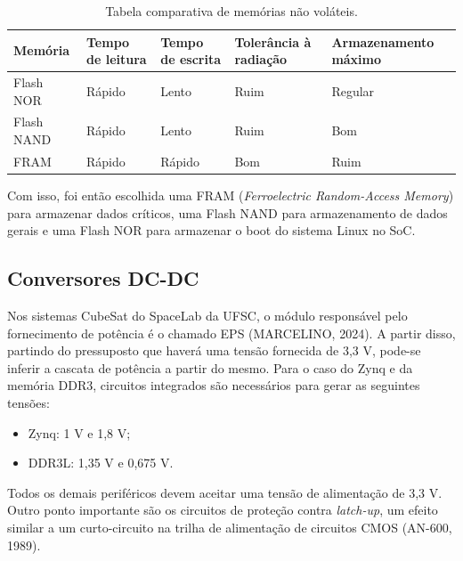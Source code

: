 \begin{table}[H]
	\ABNTEXfontereduzida
	\caption{\label{tab:memnvol}Tabela comparativa de memórias não voláteis.}
    \centering
    \begin{tabular}{@{} >{\centering}p{2cm} >{\centering}p{3cm} >{\centering}p{3cm} >{\centering}p{3cm}>{\centering}p{3cm} @{}}
    
		\toprule
		\textbf{Memória} & \textbf{Tempo de leitura} & \textbf{Tempo de escrita} & \textbf{Tolerância à radiação} & \textbf{Armazenamento máximo} \tabularnewline 
        \midrule
        Flash NOR & Rápido & Lento & Ruim & Regular\tabularnewline
        
        \midrule
        Flash NAND & Rápido & Lento & Ruim & Bom \tabularnewline 

        \midrule
        FRAM & Rápido & Rápido & Bom & Ruim \tabularnewline 
        
        \bottomrule
	\end{tabular}
\end{table}

Com isso, foi então escolhida uma FRAM (\textit{Ferroelectric Random-Access Memory}) para armazenar dados críticos, uma Flash NAND para armazenamento de dados gerais e uma Flash NOR para armazenar o boot do sistema Linux no SoC.

\subsection{Conversores DC-DC}
Nos sistemas CubeSat do SpaceLab da UFSC, o módulo responsável pelo fornecimento de potência é o chamado EPS (MARCELINO, 2024). A partir disso, partindo do pressuposto que haverá uma tensão fornecida de 3,3 V, pode-se inferir a cascata de potência a partir do mesmo. Para o caso do Zynq e da memória DDR3, circuitos integrados são necessários para gerar as seguintes tensões: 

\begin{itemize}
	\item Zynq: 1 V e 1,8 V; 
	\item DDR3L: 1,35 V e 0,675 V.
\end{itemize}

Todos os demais periféricos devem aceitar uma tensão de alimentação de 3,3 V. Outro ponto importante são os circuitos de proteção contra \textit{latch-up}, um efeito similar a um curto-circuito na trilha de alimentação de circuitos CMOS (AN-600, 1989). 

